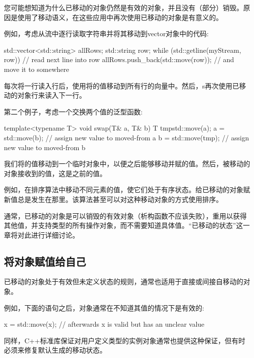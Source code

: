 您可能想知道为什么已移动的对象仍然是有效的对象，并且没有（部分）销毁。原因是使用了移动语义，在这些应用中再次使用已移动的对象是有意义的。

例如，考虑从流中逐行读取字符串并将其移动到vector对象中的代码:

\begin{cppcode}
std::vector<std::string> allRows;
std::string row;
while (std::getline(myStream, row)) { // read next line into row
	allRows.push_back(std::move(row)); // and move it to somewhere
}
\end{cppcode}

每次将一行读入行后，使用将的值移动到所有行的向量中。然后，s再次使用已移动的对象行来读入下一行。

第二个例子，考虑一个交换两个值的泛型函数:

\begin{cppcode}
template<typename T>
void swap(T& a, T& b)
{
	T tmp{std::move(a)};
	a = std::move(b); // assign new value to moved-from a
	b = std::move(tmp); // assign new value to moved-from b
}
\end{cppcode}

我们将的值移动到一个临时对象中，以便之后能够移动并赋的值。然后，被移动的对象接收到的值，这是之前的值。

例如，在排序算法中移动不同元素的值，使它们处于有序状态。给已移动的对象赋新值总是发生在那里。该算法甚至可以对这种移动对象的方式使用排序。

通常，已移动的对象是可以销毁的有效对象（析构函数不应该失败），重用以获得其他值，并支持类型的所有操作对象，而不需要知道具体值。“已移动的状态”这一章将对此进行详细讨论。

\subsection{将对象赋值给自己}

已移动的对象处于有效但未定义状态的规则，通常也适用于直接或间接自移动的对象。

例如，下面的语句之后，对象通常在不知道其值的情况下是有效的:

\begin{cppcode}
x = std::move(x); // afterwards x is valid but has an unclear value
\end{cppcode}

同样，C++标准库保证对用户定义类型的实例对象通常也提供这种保证，但有时必须来修复默认生成的移动状态。



